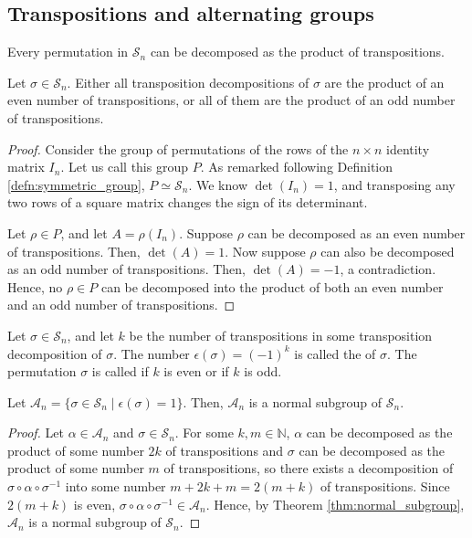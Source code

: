 \subsection*{Transpositions and alternating groups}

\begin{cor}
Every permutation in $ \mathcal{S}_n $ can be decomposed as the product of transpositions.
\end{cor}

\begin{prop}
Let $ \sigma\in\mathcal{S}_n $. Either all transposition decompositions of $ \sigma $ are the product of an even number of transpositions, or all of them are the product of an odd number of transpositions.
\end{prop}
\begin{proof}
Consider the group of permutations of the rows of the $ n\times n $ identity matrix $ I_n $. Let us call this group $ P $. As remarked following Definition \ref{defn:symmetric_group}, $ P\simeq\mathcal{S}_n $. We know $ \det(I_n)=1 $, and transposing any two rows of a square matrix changes the sign of its determinant.

Let $ \rho\in P $, and let $ A=\rho(I_n) $. Suppose $ \rho $ can be decomposed as an even number of transpositions. Then, $ \det(A)=1 $. Now suppose $ \rho $ can also be decomposed as an odd number of transpositions. Then, $ \det(A)=-1 $, a contradiction. Hence, no $ \rho\in P $ can be decomposed into the product of both an even number and an odd number of transpositions.
\end{proof}

\begin{defn}
Let $ \sigma\in\mathcal{S}_n $, and let $ k $ be the number of transpositions in some transposition decomposition of $ \sigma $. The number $ \epsilon(\sigma)=(-1)^k $ is called the  of $ \sigma $. The permutation $ \sigma $ is called  if $ k $ is even or  if $ k $ is odd.
\end{defn}

\begin{prop}\label{prop:alternating_group}
Let $ \mathcal{A}_n=\{\sigma\in\mathcal{S}_n\mid\epsilon(\sigma)=1\} $. Then, $ \mathcal{A}_n $ is a normal subgroup of $ \mathcal{S}_n $.
\end{prop}
\begin{proof}
Let $ \alpha\in\mathcal{A}_n $ and $ \sigma\in\mathcal{S}_n $. For some $ k,m\in\mathbb{N} $, $ \alpha $ can be decomposed as the product of some number $ 2k $ of transpositions and $ \sigma $ can be decomposed as the product of some number $ m $ of transpositions, so there exists a decomposition of $ \sigma\circ\alpha\circ\sigma^{-1} $ into some number $ m+2k+m=2(m+k) $ of transpositions. Since $ 2(m+k) $ is even, $ \sigma\circ\alpha\circ\sigma^{-1}\in\mathcal{A}_n $. Hence, by Theorem \ref{thm:normal_subgroup}, $ \mathcal{A}_n $ is a normal subgroup of $ \mathcal{S}_n $.
\end{proof}

